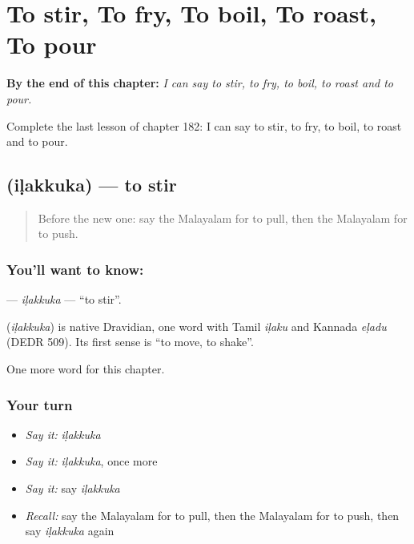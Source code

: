 
\chapter{To stir, To fry, To boil, To roast, To pour}
\label{ch:ml-to-stir-to-fry-to-boil-to-roast-to-pour}

\begin{chapteropening}
\textbf{By the end of this chapter:} \emph{I can say to stir, to fry, to boil, to roast and to pour.}

Complete the last lesson of chapter 182: I can say to stir, to fry, to boil, to roast and to pour.
\end{chapteropening}

\section[\texorpdfstring{\ml{ഇളക്കുക} (iḷakkuka)}{ഇളക്കുക (iḷakkuka)}]{ (iḷakkuka) — to stir}

\label{lesson:ML-C182-ilakkuka}



\begin{quote}
Before the new one: say the Malayalam for to pull, then the Malayalam for to push.
\end{quote}

\subsection*{You'll want to know: }
\textbf{} — \emph{iḷakkuka} — \textquotedblleft{}to stir\textquotedblright{}.

\begin{cousinweb}
\textbf{} (\emph{iḷakkuka}) is native Dravidian, one word with Tamil \emph{iḷaku} and Kannada \emph{eḷadu} (DEDR 509). Its first sense is \textquotedblleft{}to move, to shake\textquotedblright{}.
\end{cousinweb}

\begin{grammarlens}[title={What you've built}]
One more word for this chapter.
\end{grammarlens}

\subsection*{Your turn}
\begin{itemize}
\raggedright
  \item \emph{Say it:} \emph{iḷakkuka}
  \item \emph{Say it:} \emph{iḷakkuka}, once more
  \item \emph{Say it:} say \emph{iḷakkuka}
  \item \emph{Recall:} say the Malayalam for to pull, then the Malayalam for to push, then say \emph{iḷakkuka} again
\end{itemize}

